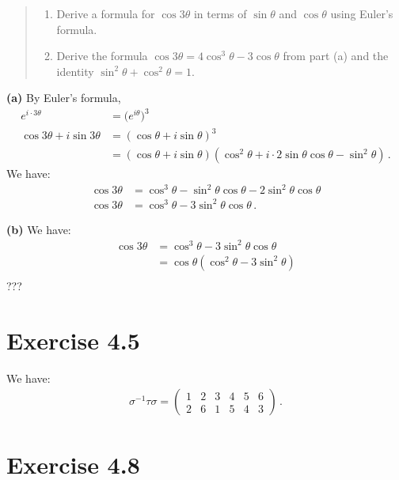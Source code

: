 \documentclass{article}
\begin{document}
\begin{quote}
    \itshape
    \begin{enumerate}[label=\alph*.]
        \item Derive a formula for $\cos 3\theta$ in terms of $\sin \theta$
        and $\cos \theta$ using Euler's formula.
        \item Derive the formula $\cos 3\theta = 4\cos^3 \theta - 3 \cos \theta$
        from part (a) and the identity $\sin^2 \theta + \cos^2 \theta = 1$.
    \end{enumerate}
\end{quote}
\textbf{(a)} By Euler's formula,
\begin{align*}
    e^{i\cdot 3\theta} &= \bigl(e^{i\theta}\bigr)^3 \\
     \cos 3\theta + i\sin 3\theta &= (\cos \theta + i \sin \theta)^3 \\
    &= (\cos \theta + i \sin \theta)(\cos^2 \theta + i \cdot 2 \sin \theta \cos \theta - \sin^2 \theta) \,.
\end{align*}
We have:
\begin{align*}
    \cos 3\theta &= \cos^3 \theta - \sin^2 \theta \cos \theta - 2 \sin^2 \theta \cos \theta \\
    \cos 3\theta &= \cos^3 \theta - 3 \sin^2 \theta \cos \theta \,.
\end{align*}

\textbf{(b)} We have:
\begin{align*}
    \cos 3\theta &= \cos^3 \theta - 3 \sin^2 \theta \cos \theta \\
    &= \cos \theta(\cos^2 \theta - 3 \sin^2 \theta) \\
\end{align*}
???

\section*{Exercise 4.5}

We have:
\begin{align*}
    \sigma^{-1}\tau\sigma = \begin{pmatrix}
        1 & 2 & 3 & 4 & 5 & 6 \\
        2 & 6 & 1 & 5 & 4 & 3
    \end{pmatrix} \,.
\end{align*}

\section*{Exercise 4.8}
\end{document}
